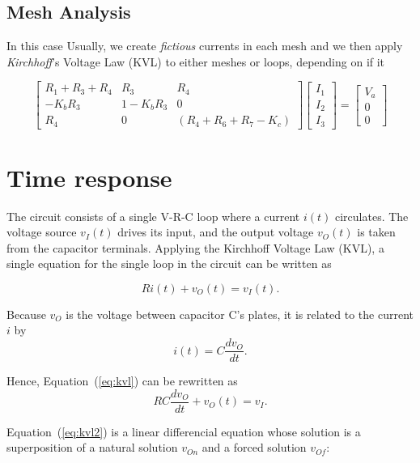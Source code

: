 \subsection{Mesh Analysis}
\label{subsec:mesh_analysis}

In this case 
Usually, we create \textit{fictious} currents in each mesh and we then apply \textit{Kirchhoff}'s Voltage Law (KVL) to either meshes or loops, depending on if it

\[
\begin{bmatrix}
R_1+R_3+R_4 & R_3 & R_4 \\
-K_bR_3 & 1-K_bR_3 & 0 \\
R_4 & 0 & (R_4+R_6+R_7-K_c)
\end{bmatrix}
\begin{bmatrix}
I_1 \\
I_2 \\
I_3
\end{bmatrix}
=
\begin{bmatrix}
V_a \\
0 \\
0
\end{bmatrix}
\]

\section{Time response}

The circuit consists of a single V-R-C loop where a current $i(t)$ circulates. The
voltage source $v_I(t)$ drives its input, and the output voltage $v_O(t)$ is taken from
the capacitor terminals. Applying the Kirchhoff Voltage Law (KVL), a single
equation for the single loop in the circuit can be written as

\begin{equation}
  Ri(t) + v_O(t) = v_I(t).
  \label{eq:kvl}
\end{equation}

Because $v_O$ is the voltage between capacitor C's plates, it is related to the
current $i$ by
\begin{equation}
  i(t) = C\frac{dv_O}{dt}.
\end{equation}

Hence, Equation~(\ref{eq:kvl}) can be rewritten as
\begin{equation}
  RC\frac{dv_O}{dt} + v_O(t) = v_I.
  \label{eq:kvl2}
\end{equation}

Equation~(\ref{eq:kvl2}) is a linear differencial equation whose solution is a
superposition of a natural solution $v_{On}$ and a forced solution $v_{Of}$:

